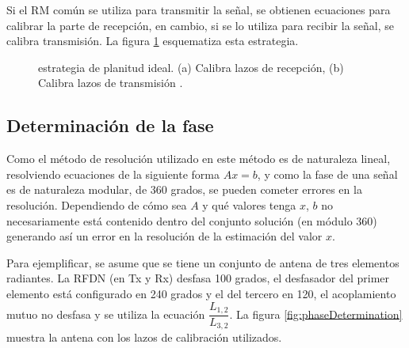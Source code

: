 Si el RM común se utiliza para transmitir la señal, se obtienen ecuaciones para calibrar la parte de recepción, en cambio,
si se lo utiliza para recibir la señal, se calibra transmisión. La figura \ref{fig:ideal_strategy} esquematiza esta estrategia.

\begin{figure}[H]
 \centering
	\caption{estrategia de planitud ideal. (a) Calibra lazos de recepción, (b) Calibra lazos de transmisión \cite{Aumann1989}.}
 \label{fig:ideal_strategy}
\end{figure}


\subsection{Determinación de la fase} \label{ssc:mutualPhase}

Como el método de resolución utilizado en este método es de naturaleza lineal, resolviendo ecuaciones de la siguiente forma
$Ax = b$, y como la fase de una señal es de naturaleza modular, de 360 grados, se pueden cometer errores en la resolución.
Dependiendo de cómo sea $A$ y qué valores tenga $x$, $b$ no necesariamente está contenido dentro del conjunto solución (en
módulo 360) generando así un error en la resolución de la estimación del valor $x$.

Para ejemplificar, se asume que se tiene un conjunto de antena de tres elementos radiantes. La RFDN (en Tx y Rx) desfasa 100
grados, el desfasador del primer elemento está configurado en 240 grados y el del tercero en 120, el acoplamiento mutuo no desfasa
y se utiliza la ecuación $\dfrac{L_{1,2}}{L_{3, 2}}$. La figura \ref{fig:phaseDetermination} muestra la antena con los 
lazos de calibración utilizados.

